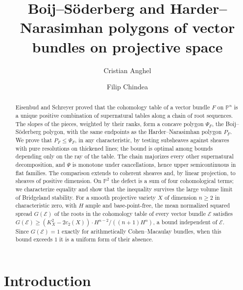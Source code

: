 \documentclass[11pt]{amsart}
\title[Boij--Söderberg and Harder--Narasimhan polygons]{Boij--Söderberg and Harder--Narasimhan polygons of vector bundles on projective space}
\author{Cristian Anghel}
\author{Filip Chindea}
\theoremstyle{definition}
\theoremstyle{remark}
\newcommand{\PP}{\mathbb{P}}
\newcommand{\cE}{\mathcal{E}}
\begin{document}
\begin{abstract}
Eisenbud and Schreyer proved that the cohomology table of a vector bundle $F$ on $\PP^n$ is a unique positive combination of supernatural tables along a chain of root sequences. The slopes of the pieces, weighted by their ranks, form a concave polygon $\Psi_F$, the Boij--Söderberg polygon, with the same endpoints as the Harder--Narasimhan polygon $P_F$. We prove that $P_F\le\Psi_F$, in any characteristic, by testing subsheaves against sheaves with pure resolutions on thickened lines; the bound is optimal among bounds depending only on the ray of the table. The chain majorizes every other supernatural decomposition, and $\Psi$ is monotone under cancellations, hence upper semicontinuous in flat families. The comparison extends to coherent sheaves and, by linear projection, to sheaves of positive dimension. On $\PP^2$ the defect is a sum of four cohomological terms; we characterize equality and show that the inequality survives the large volume limit of Bridgeland stability. For a smooth projective variety $X$ of dimension $n\ge2$ in characteristic zero, with $H$ ample and base-point-free, the mean normalized squared spread $G(\cE)$ of the roots in the cohomology table of every vector bundle $\cE$ satisfies $G(\cE)\ge(K_X^2-2c_2(X))\cdot H^{n-2}/((n+1)H^n)$, a bound independent of $\cE$. Since $G(\cE)=1$ exactly for arithmetically Cohen--Macaulay bundles, when this bound exceeds $1$ it is a uniform form of their absence.
\end{abstract}

\maketitle

\enlargethispage{2pt}
\setcounter{tocdepth}{1}
\tableofcontents

\section{Introduction}\label{sec:intro}
\end{document}
